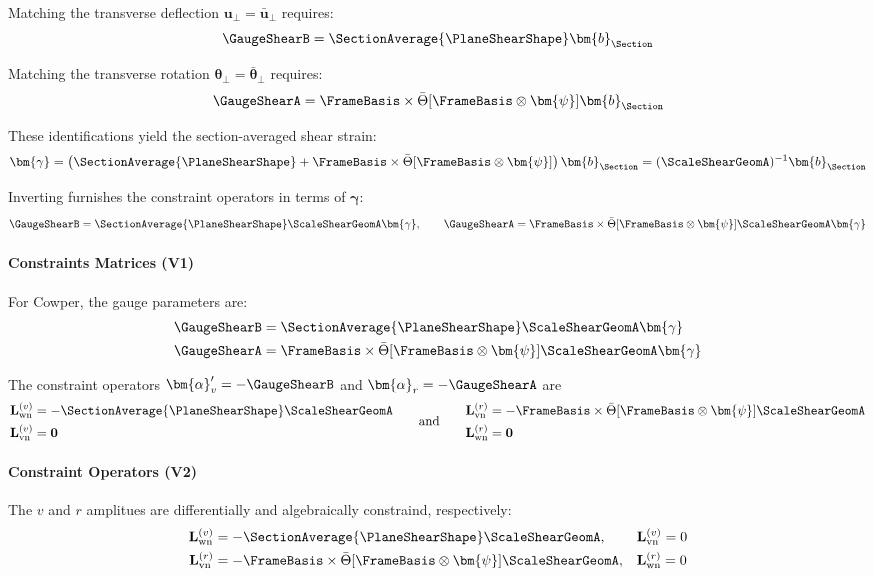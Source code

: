 Matching the transverse deflection \(\bm{u}_\perp = \bar{\bm{u}}_\perp\)
requires: 
\[
\GaugeShearB = \SectionAverage{\PlaneShearShape}\bm{b}_{\Section}
\]

Matching the transverse rotation
\(\bm{\theta}_\perp = \bar{\bm{\theta}}_\perp\) requires:
\[
\GaugeShearA = \FrameBasis\times\bar{\Theta}[\FrameBasis\otimes\bm{\psi}]\bm{b}_{\Section}
\]

These identifications yield the section-averaged shear strain:
\[
\bm{\gamma} = \left(\SectionAverage{\PlaneShearShape} + \FrameBasis\times\bar{\Theta}[\FrameBasis\otimes\bm{\psi}]\right) \bm{b}_{\Section}
= (\ScaleShearGeomA)^{-1}\bm{b}_{\Section}
\]

Inverting furnishes the constraint operators in terms of
\(\bm{\gamma}\):
\[
\GaugeShearB = \SectionAverage{\PlaneShearShape}\ScaleShearGeomA\bm{\gamma}, \qquad \GaugeShearA = \FrameBasis\times\bar{\Theta}[\FrameBasis\otimes\bm{\psi}]\ScaleShearGeomA\bm{\gamma}
\]

\paragraph{Constraints Matrices (V1)}

For Cowper, the gauge parameters are:
\[
\begin{aligned}
\GaugeShearB &= \SectionAverage{\PlaneShearShape}\ScaleShearGeomA\bm{\gamma}\\
\GaugeShearA &= \FrameBasis\times\bar{\Theta}[\FrameBasis\otimes\bm{\psi}]\ScaleShearGeomA\bm{\gamma}
\end{aligned}
\]

The constraint operators \(\bm{\alpha}'_v = -\GaugeShearB\) and 
\(\bm{\alpha}_r = -\GaugeShearA\) are
\[
\begin{aligned}
\mathbf{L}_{\rm wn}^{(v)} &= -\SectionAverage{\PlaneShearShape}\ScaleShearGeomA \\
\mathbf{L}_{\rm vn}^{(v)} &= \mathbf{0}
\end{aligned}
\qquad\text{and}\qquad
\begin{aligned}
\mathbf{L}_{\rm vn}^{(r)} &= -\FrameBasis\times\bar{\Theta}[\FrameBasis\otimes\bm{\psi}]\ScaleShearGeomA \\
\mathbf{L}_{\rm wn}^{(r)} &= \mathbf{0}
\end{aligned}
\]

\paragraph{Constraint Operators (V2)}
The \(v\) and \(r\) amplitues are differentially and algebraically constraind, respectively:
\[
\begin{aligned}
\mathbf{L}_{\rm wn}^{(v)} &= -\SectionAverage{\PlaneShearShape}\ScaleShearGeomA, && \mathbf{L}_{\rm vn}^{(v)} = 0 \\
\mathbf{L}_{\rm vn}^{(r)} &= -\FrameBasis\times\bar{\Theta}[\FrameBasis\otimes\bm{\psi}]\ScaleShearGeomA, 
&& \mathbf{L}_{\rm wn}^{(r)} = 0
\end{aligned}
\]


